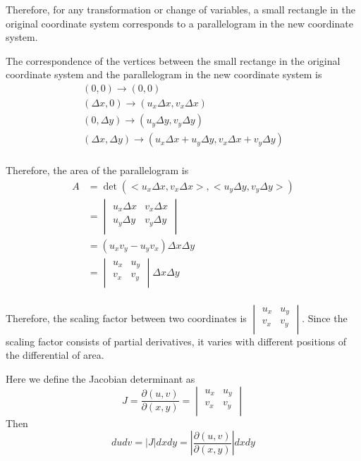 \documentclass{article}
\begin{document}
Therefore, for any transformation or change of variables, a small rectangle in 
the original coordinate system corresponds to a parallelogram in the new 
coordinate system.

The correspondence of the vertices between the small rectange in the original 
coordinate system and the parallelogram in the new coordinate system is
\begin{gather*}
  (0, 0) \rightarrow (0, 0) \\
  (\Delta x, 0) \rightarrow (u_x \Delta x, v_x \Delta x) \\
  (0, \Delta y) \rightarrow (u_y \Delta y, v_y \Delta y) \\
  (\Delta x, \Delta y) \rightarrow (u_x \Delta x + u_y \Delta y, v_x \Delta x + v_y \Delta y) \\
\end{gather*}

Therefore, the area of the parallelogram is
\begin{equation*}
  \begin{split}
    A &= \det(<u_x \Delta x, v_x \Delta x>, <u_y \Delta y, v_y \Delta y>) \\
      &= \begin{vmatrix}
           u_x \Delta x & v_x \Delta x \\
           u_y \Delta y & v_y \Delta y \\
         \end{vmatrix} \\
      &= (u_x v_y - u_y v_x) \Delta x \Delta y \\
      &= \begin{vmatrix}
           u_x & u_y \\
           v_x & v_y \\
         \end{vmatrix} \Delta x \Delta y \\
  \end{split}
\end{equation*}

Therefore, the scaling factor between two coordinates is 
$\begin{vmatrix}
   u_x & u_y \\
   v_x & v_y \\
\end{vmatrix}$. Since the scaling factor consists of partial derivatives, it 
varies with different positions of the differential of area.

Here we define the Jacobian determinant as
\begin{equation*}
  J = \frac{\partial(u, v)}{\partial(x, y)} = \begin{vmatrix}
                                                u_x & u_y \\
                                                v_x & v_y \\ 
                                              \end{vmatrix}
\end{equation*}
Then
\begin{equation*}
  du dv = |J| dx dy = |\frac{\partial(u, v)}{\partial(x, y)}| dx dy
\end{equation*}
\end{document}
